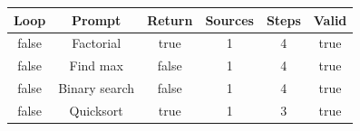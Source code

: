 \begin{table}[h]
\centering
\begin{tabular}{ |c|c|c|c|c|c| }
\hline
Loop & Prompt & Return & Sources & Steps & Valid \\
\hline
false & Factorial & true & 1 & 4 & true \\
\hline
false & Find max & false & 1 & 4 & true \\
\hline
false & Binary search & false & 1 & 4 & true \\
\hline
false & Quicksort & true & 1 & 3 & true \\
\hline
\end{tabular}
\end{table}

